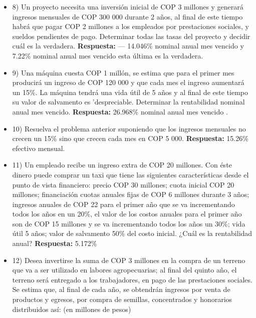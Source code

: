 \begin{itemize}
 \item 8) Un proyecto necesita una inversión inicial de COP 3 millones y generará ingresos mensuales de COP 300 000 durante 2 años, al final de este tiempo habrá que pagar COP 2 millones a los empleados por prestaciones sociales, y sueldos pendientes de pago. Determinar todas las tasas del proyecto y decidir cuál es la verdadera.
       \textbf{ Respuesta:}  — 14.046\% nominal anual mes vencido  y 7.22\% nominal anual mes vencido  esta última es la verdadera.

 \item 9) Una máquina cuesta COP 1 millón, se estima que para el primer mes producirá un ingreso de COP 120 000 y que cada mes el ingreso aumentará un 15\%. La máquina tendrá una vida útil de 5 años y al final de este tiempo su valor de salvamento es 'despreciable. Determinar la rentabilidad nominal anual mes vencido.
       \textbf{ Respuesta:} 26.968\% nominal anual mes vencido .

 \item 10) Resuelva el problema anterior suponiendo que los ingresos mensuales no crecen un 15\% sino que crecen cada mes en COP 5 000.
       \textbf{ Respuesta:} 15.26\% efectivo mensual.

 \item 11) Un empleado recibe un ingreso extra de COP 20 millones. Con éste dinero puede comprar un taxi que tiene las siguientes características desde el punto de vista financiero: precio COP 30 millones; cuota inicial COP 20 millones; financiación cuotas anuales fijas de COP 6 millones durante 3 años; ingresos anuales de COP 22 para el primer año que se va incrementando todos los años en un 20\%, el valor de los costos anuales para el primer año son de COP 15 millones y se va incrementando todos los años un 30\%; vida útil 5 años; valor de salvamento 50\% del costo inicial. ¿Cuál es la rentabilidad anual?
       \textbf{ Respuesta:} 5.172\%

 \item 12) Desea invertirse la suma de COP 3 millones en la compra de un terreno que va a ser utilizado en labores agropecuarias; al final del quinto año, el terreno será entregado a los trabajadores, en pago de las prestaciones sociales. Se estima que, al final de cada año, se obtendrán ingresos por venta de productos y egresos, por compra de semillas, concentrados y honorarios distribuidos así: (en millones de pesos)

       \begin{center}


\end{center}
\end{itemize}
